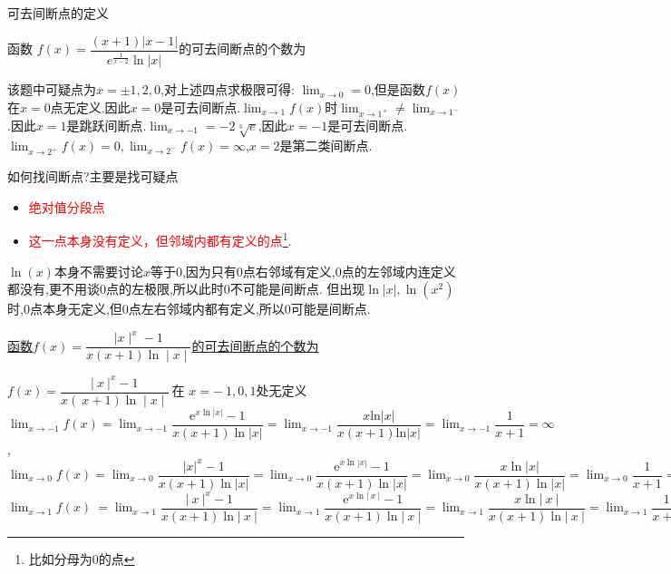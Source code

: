 \documentclass[8pt a4paper, oneside, UTF8]{ctexbook}
\begin{document}
\begin{sloppypar}
\begin{defn}{可去间断点的定义}{}
\begin{center}
        \end{center}
    \end{defn}
    \begin{problem}
        函数 $f\left(x\right)=\dfrac{(x+1)|x-1|}{e^{\frac{1}{x-2}}\ln|x|}$的可去间断点的个数为
    \end{problem}
    \begin{solution}
        该题中可疑点为$x = \pm 1,2,0$,对上述四点求极限可得:
        $\lim_{x\to 0}=0$,但是函数$f(x)$在$x=0$点无定义.因此$x=0$是可去间断点.$\lim_{x\to 1}f(x)$时$\lim_{x\to1^+}\neq \lim_{x\to 1^-}$.因此$x=1$是跳跃间断点.$\lim_{x\to -1}=-2\sqrt[3]{e}$,因此$x=-1$是可去间断点.$\lim_{x\to2^+}f(x)=0,\lim_{x\to2^-}f(x)=\infty$,$x=2$是第二类间断点.
    \end{solution}
    \begin{note}
        如何找间断点?主要是找可疑点
        \begin{itemize}
            \item \textcolor{red}{绝对值分段点}
            \item \textcolor{red}{这一点本身没有定义，但邻域内都有定义的点}\footnote{比如分母为0的点}.
        \end{itemize}
        $\ln(x)$本身不需要讨论$x$等于$0$,因为只有$0$点右邻域有定义,$0$点的左邻域内连定义都没有,更不用谈$0$点的左极限,所以此时$0$不可能是间断点.
        但出现$\ln |x|,\ln(x^2)$时,$0$点本身无定义,但$0$点左右邻域内都有定义,所以$0$可能是间断点.
    \end{note}
    \begin{problem}
        \uline{函数$f(x)=\dfrac{\mid x\mid^{x}-1}{x(x+1)\ln\mid x\mid}$的可去间断点的个数为}
    \end{problem}
    \begin{solution}
        $f(x)=\dfrac{\left|\:x\:\right|^{x}-1}{x(\:x+1)\ln\mid x\mid}\:$在 $x=-\:1,0,1$\:处无定义\:\\ 
        $\operatorname*{lim}_{x\to-1}f(x)=\operatorname*{lim}_{x\to-1}\dfrac{\mathrm{e}^{x\ln\left|x\right|}-1}{x(x+1)\ln\left|x\right|}=\operatorname*{lim}_{x\to-1}\dfrac{x\mathrm{ln}\left|x\right|}{x(x+1)\mathrm{ln}\left|x\right|}=\operatorname*{lim}_{x\to-1}\dfrac{1}{x+1}=\infty$, \\
        $\lim_{x\to0}f(x)=\lim_{x\to0}\dfrac{\left|x\right|^{x}-1}{x(x+1)\ln\left|x\right|}=\lim_{x\to0}\dfrac{\mathrm{e}^{x\ln\left|x\right|}-1}{x(x+1)\ln\left|x\right|}=\lim_{x\to0}\dfrac{x\ln\left|x\right|}{x(x+1)\ln\left|x\right|}=\lim_{x\to0}\dfrac{1}{x+1}=1\:, $\\
        $\operatorname*{lim}_{x\to1}f(x)\:=\operatorname*{lim}_{x\to1}{\dfrac{\left|\:x\:\right|^{x}-1}{x(x+1)\ln\left|\:x\:\right|}}=\operatorname*{lim}_{x\to1}{\dfrac{\mathrm{e}^{x\ln\left|\:x\:\right|}-1}{x(x+1)\ln\left|\:x\:\right|}}=\operatorname*{lim}_{x\to1}{\dfrac{x\ln\left|\:x\:\right|}{x(x+1)\ln\left|\:x\:\right|}}=\operatorname*{lim}_{x\to1}{\dfrac{1}{x+1}}={\dfrac{1}{2}}$

\end{solution}
\end{sloppypar}
\end{document}
